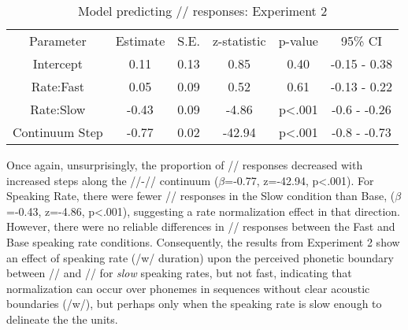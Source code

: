 \documentclass[preprint]{JASA}
\begin{document}
\begin{table}

\caption{\label{tab:exp2-sh-prop-model-summary}Model predicting /\textesh/ responses: Experiment 2}
\centering
\begin{tabular}[t]{cccccc}
\toprule
Parameter & Estimate & S.E. & z-statistic & p-value & 95\% CI\\
Intercept & 0.11 & 0.13 & 0.85 & 0.40 & -0.15 - 0.38\\
Rate:Fast & 0.05 & 0.09 & 0.52 & 0.61 & -0.13 - 0.22\\
Rate:Slow & -0.43 & 0.09 & -4.86 & p\textless.001 & -0.6 - -0.26\\
Continuum Step & -0.77 & 0.02 & -42.94 & p\textless.001 & -0.8 - -0.73\\
\end{tabular}
\end{table}

Once again, unsurprisingly, the proportion of /\textesh/ responses decreased with increased steps along the /\textesh/-/\textteshlig/ continuum (\(\beta\)=-0.77, z=-42.94, p\textless.001). For Speaking Rate, there were fewer /\textesh/ responses in the Slow condition than Base, (\(\beta\)=-0.43, z=-4.86, p\textless.001), suggesting a rate normalization effect in that direction. However, there were no reliable differences in /\textesh/ responses between the Fast and Base speaking rate conditions. Consequently, the results from Experiment 2 show an effect of speaking rate (/w/ duration) upon the perceived phonetic boundary between /\textesh/ and /\textteshlig/ for \textit{slow} speaking rates, but not fast, indicating that normalization can occur over phonemes in sequences without clear acoustic boundaries (/w\textsci/), but perhaps only when the speaking rate is slow enough to delineate the the units. 

\end{document}
